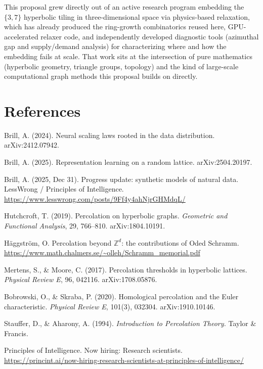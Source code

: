 \documentclass[11pt]{article}
\begin{document}
This proposal grew directly out of an active research program embedding the $\{3,7\}$ hyperbolic tiling in three-dimensional space via physics-based relaxation, which has already produced the ring-growth combinatorics reused here, GPU-accelerated relaxer code, and independently developed diagnostic tools (azimuthal gap and supply/demand analysis) for characterizing where and how the embedding fails at scale. That work sits at the intersection of pure mathematics (hyperbolic geometry, triangle groups, topology) and the kind of large-scale computational graph methods this proposal builds on directly.

\section*{References}

\noindent Brill, A. (2024). Neural scaling laws rooted in the data distribution. arXiv:2412.07942.

\noindent Brill, A. (2025). Representation learning on a random lattice. arXiv:2504.20197.

\noindent Brill, A. (2025, Dec 31). Progress update: synthetic models of natural data. LessWrong / Principles of Intelligence. \url{https://www.lesswrong.com/posts/9Ff4y4ahNjrGHMdqL/}

\noindent Hutchcroft, T. (2019). Percolation on hyperbolic graphs. \textit{Geometric and Functional Analysis}, 29, 766--810. arXiv:1804.10191.

\noindent H\"aggstr\"om, O. Percolation beyond $\mathbb{Z}^d$: the contributions of Oded Schramm. \url{https://www.math.chalmers.se/~olleh/Schramm_memorial.pdf}

\noindent Mertens, S., \& Moore, C. (2017). Percolation thresholds in hyperbolic lattices. \textit{Physical Review E}, 96, 042116. arXiv:1708.05876.

\noindent Bobrowski, O., \& Skraba, P. (2020). Homological percolation and the Euler characteristic. \textit{Physical Review E}, 101(3), 032304. arXiv:1910.10146.

\noindent Stauffer, D., \& Aharony, A. (1994). \textit{Introduction to Percolation Theory.} Taylor \& Francis.

\noindent Principles of Intelligence. Now hiring: Research scientists. \url{https://princint.ai/now-hiring-research-scientists-at-principles-of-intelligence/}
\end{document}
